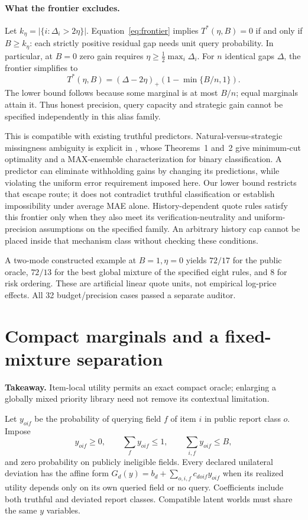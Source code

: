 \documentclass[11pt]{article}
\begin{document}
\paragraph{What the frontier excludes.}
Let $k_\eta=|\{i:\Delta_i>2\eta\}|$. Equation~\eqref{eq:frontier}
implies $T^*(\eta,B)=0$ if and only if $B\geq k_\eta$: each strictly
positive residual gap needs unit query probability. In particular, at $B=0$
zero gain requires $\eta\geq\frac12\max_i\Delta_i$. For $n$ identical gaps
$\Delta$, the frontier simplifies to
\[
 T^*(\eta,B)=(\Delta-2\eta)_+\left(1-\min\{B/n,1\}\right).
\]
The lower bound follows because some marginal is at most $B/n$; equal
marginals attain it. Thus honest precision, query capacity and strategic gain
cannot be specified independently in this alias family.

This is compatible with existing truthful predictors. Natural-versus-strategic
missingness ambiguity is explicit in \cite{withheld}, whose Theorems~1 and~2
give minimum-cut optimality and a MAX-ensemble characterization for binary
classification. A predictor can eliminate withholding gains by changing its
predictions, while violating the uniform error requirement imposed here.
Our lower bound restricts that escape route; it does not contradict truthful
classification or establish impossibility under average MAE alone.
History-dependent quote rules satisfy this frontier only when they also meet
its verification-neutrality and uniform-precision assumptions on the specified
family. An arbitrary history cap cannot be placed inside that mechanism class
without checking these conditions.

A two-mode constructed example at $B=1,\eta=0$ yields $72/17$ for the public
oracle, $72/13$ for the best global mixture of the specified eight rules, and
$8$ for risk ordering. These are artificial linear quote units, not empirical
log-price effects. All 32 budget/precision cases passed a separate auditor.

\section{Compact marginals and a fixed-mixture separation}
\noindent\textbf{Takeaway.} Item-local utility permits an exact compact oracle;
enlarging a globally mixed priority library need not remove its contextual limitation.

Let $y_{oif}$ be the probability of querying field $f$ of item $i$ in public
report class $o$. Impose
\[
y_{oif}\ge0,\qquad \sum_f y_{oif}\le1,\qquad
\sum_{i,f}y_{oif}\le B,
\]
and zero probability on publicly ineligible fields. Every declared unilateral
deviation has the affine form $G_d(y)=b_d+\sum_{o,i,f}c_{doif}y_{oif}$ when its
realized utility depends only on its own queried field or no query. Coefficients
include both truthful and deviated report classes. Compatible latent worlds
must share the same $y$ variables.
\end{document}
